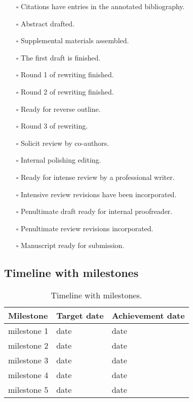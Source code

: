 \documentclass[11pt,letterpaper]{article}
\begin{document}
\begin{itemize}
\item[{$\square$}] Citations have entries in the annotated bibliography.
\item[{$\square$}] Abstract drafted.
\item[{$\square$}] Supplemental materials assembled.
\item[{$\square$}] The first draft is finished.
\item[{$\square$}] Round 1 of rewriting finished.
\item[{$\square$}] Round 2 of rewriting finished.
\item[{$\square$}] Ready for reverse outline.
\item[{$\square$}] Round 3 of rewriting.
\item[{$\square$}] Solicit review by co-authors.
\item[{$\square$}] Internal polishing editing.
\item[{$\square$}] Ready for intense review by a professional writer.
\item[{$\square$}] Intensive review revisions have been incorporated.
\item[{$\square$}] Penultimate draft ready for internal proofreader.
\item[{$\square$}] Penultimate review revisions incorporated.
\item[{$\square$}] Manuscript ready for submission.
\end{itemize}




\subsection{Timeline with milestones}
\label{sec:org095a5d8}



\begin{table}[htbp]
\caption[Milestones]{Timeline with milestones.}
\centering
\begin{tabular}{lll}
Milestone & Target date & Achievement date\\[0pt]
\hline
milestone 1 & date & date\\[0pt]
milestone 2 & date & date\\[0pt]
milestone 3 & date & date\\[0pt]
milestone 4 & date & date\\[0pt]
milestone 5 & date & date\\[0pt]
\end{tabular}
\end{table}
\end{document}
